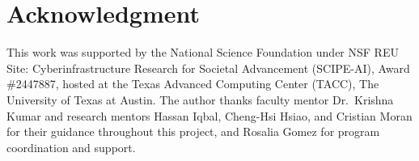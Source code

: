 \documentclass[conference]{IEEEtran}
\begin{document}
\section*{Acknowledgment}
This work was supported by the National Science Foundation under NSF REU Site: Cyberinfrastructure Research for Societal Advancement (SCIPE-AI), Award \#2447887, hosted at the Texas Advanced Computing Center (TACC), The University of Texas at Austin. The author thanks faculty mentor Dr.\ Krishna Kumar and research mentors Hassan Iqbal, Cheng-Hsi Hsiao, and Cristian Moran for their guidance throughout this project, and Rosalia Gomez for program coordination and support.



\end{document}
